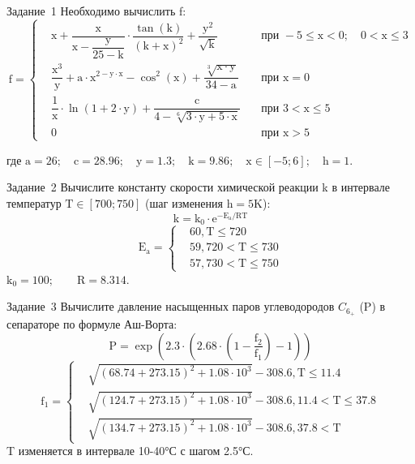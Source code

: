 \documentclass[aspectratio=169]{beamer}	%
\begin{document}
\begin{frame}[fragile]{Задание~1}
\large
Необходимо вычислить f:
\begin{equation*}
\mathrm{
f = \left\{
\begin{aligned}
	& x + \dfrac{x}{x - \dfrac{y}{25 - k}} \cdot \dfrac{\tan \left(k\right)}{\left(k + x\right)^2} + \dfrac{y^2}{\sqrt{k}} &\quad \text{при } -5 \leqslant x < 0; \quad 0 < x \leqslant 3 \\
	& \dfrac{x^3}{y} + a \cdot x ^ {2 - y \cdot x} - \cos^2\left(x\right) + \dfrac{\sqrt[3]{x \cdot y}}{34 - a} &\quad \text{при } x = 0 \\
	& \dfrac{1}{x} \cdot \ln \left(1 + 2 \cdot y\right) + \dfrac{c}{4 - \sqrt[6]{3 \cdot y + 5 \cdot x}} &\quad \text{при } 3 < x \leqslant 5 \\
	& 0 &\quad \text{при } x > 5
\end{aligned}	
\right.}
\end{equation*}

где \quad $\mathrm{a = 26; \quad c = 28.96; \quad y = 1.3; \quad k = 9.86; \quad x \in \left[-5; 6\right]; \quad h = 1}$.
\vfill
\end{frame}


\begin{frame}[fragile]{Задание~2}
\large
Вычислите константу скорости химической реакции k в интервале температур $\mathrm{T \in \left[700; 750\right]}$ (шаг изменения $\mathrm{h = 5 K}$):
\begin{equation*}
	\mathrm{k = k_0 \cdot e^{-E_a / RT}}
\end{equation*}
\begin{equation*}
\mathrm{
	E_a = \left\{
	\begin{aligned}
		& 60, T \leqslant 720 \\
		& 59, 720 < T \leqslant 730 \\
		& 57, 730 < T \leqslant 750
	\end{aligned}
	\right.}
\end{equation*}
$\mathrm{k_0 = 100; \qquad R = 8.314}$.
\vfill
\end{frame}


\begin{frame}[fragile]{Задание~3}
\large
Вычислите давление насыщенных паров углеводородов $C_{6_{+}}$ (P) в сепараторе по формуле Аш-Ворта:
\begin{equation*}
	\mathrm{P = \exp \left(2.3 \cdot \left(2.68 \cdot \left(1 - \dfrac{f_2}{f_1}\right)-1\right)\right)}
\end{equation*}
\begin{equation*}
\mathrm{
	f_1 = \left\{
	\begin{aligned}
		& \sqrt{\left(68.74 + 273.15\right)^2 + 1.08 \cdot 10^3} - 308.6, T \leqslant 11.4 \\
		& \sqrt{\left(124.7 + 273.15\right)^2 + 1.08 \cdot 10^3} - 308.6, 11.4 < T \leqslant 37.8 \\
		& \sqrt{\left(134.7 + 273.15\right)^2 + 1.08 \cdot 10^3} - 308.6,  37.8 < T
	\end{aligned}
	\right.}
\end{equation*}
T изменяется в интервале 10-40°С с шагом 2.5°С.
\vfill
\end{frame}
\end{document}
